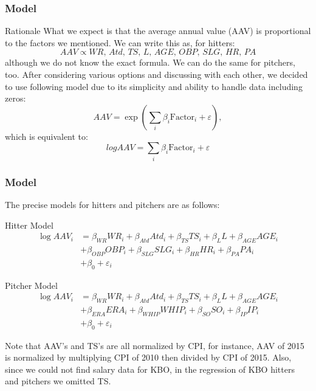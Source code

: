 \documentclass[9pt]{beamer}
\begin{document}
\begin{frame}
    \frametitle{Model}
    \begin{block}{Rationale}
        What we expect is that the average annual value (AAV) is proportional to the factors we mentioned. We can write this as, for hitters:
        \[
            AAV \propto WR, \, Atd, \, TS, \, L, \, AGE, \, OBP, \, SLG, \, HR, \, PA
        \]
        although we do not know the exact formula. We can do the same for pitchers, too. After considering various options and discussing with each other, we decided to use following model due to its simplicity and ability to handle data including zeros:
        \[
            AAV = \exp{(\sum_{i} \beta_{i} \text{Factor}_{i} + \varepsilon)}, \] which is equivalent to: \[
            log{AAV} = \sum_{i} \beta_{i} \text{Factor}_{i} + \varepsilon
        \]
    \end{block}
\end{frame}

\begin{frame}
    \frametitle{Model}
    The precise models for hitters and pitchers are as follows:
    \begin{block}{Hitter Model}
        \begin{align*}
            \log{AAV_{i}} &= \beta_{WR} WR_{i}
                + \beta_{Atd} Atd_{i}
                + \beta_{TS} TS_{i}
                + \beta_{L} L
                + \beta_{AGE} AGE_{i} \\
                &+ \beta_{OBP} OBP_{i}
                + \beta_{SLG} SLG_{i}
                + \beta_{HR} HR_{i}
                + \beta_{PA} PA_{i} \\
                &+ \beta_{0} 
                + \varepsilon_{i}
        \end{align*}
    \end{block}
    \begin{block}{Pitcher Model}
        \begin{align*}
            \log{AAV_{i}} &= \beta_{WR} WR_{i}
                + \beta_{Atd} Atd_{i} 
                + \beta_{TS} TS_{i}
                + \beta_{L} L
                + \beta_{AGE} AGE_{i} \\
                &+ \beta_{ERA} ERA_{i}
                + \beta_{WHIP} WHIP_{i}
                + \beta_{SO} SO_{i}
                + \beta_{IP} IP_{i} \\
                &+ \beta_{0} 
                + \varepsilon_{i}
        \end{align*}
    \end{block}
    Note that AAV's and TS's are all normalized by CPI, for instance, AAV of 2015 is normalized by multiplying CPI of 2010 then divided by CPI of 2015. Also, since we could not find salary data for KBO, in the regression of KBO hitters and pitchers we omitted TS.
\end{frame}
\end{document}
